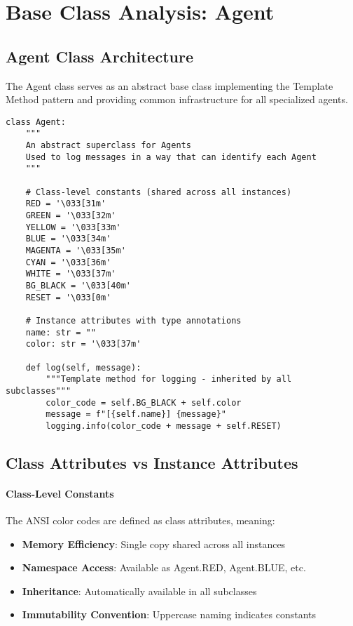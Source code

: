 \section{Base Class Analysis: Agent}

\subsection{Agent Class Architecture}

The Agent class serves as an abstract base class implementing the Template Method pattern and providing common infrastructure for all specialized agents.

\begin{lstlisting}[caption=Agent Base Class - Complete Analysis]
class Agent:
    """
    An abstract superclass for Agents
    Used to log messages in a way that can identify each Agent
    """

    # Class-level constants (shared across all instances)
    RED = '\033[31m'
    GREEN = '\033[32m'
    YELLOW = '\033[33m'
    BLUE = '\033[34m'
    MAGENTA = '\033[35m'
    CYAN = '\033[36m'
    WHITE = '\033[37m'
    BG_BLACK = '\033[40m'
    RESET = '\033[0m'

    # Instance attributes with type annotations
    name: str = ""
    color: str = '\033[37m'

    def log(self, message):
        """Template method for logging - inherited by all subclasses"""
        color_code = self.BG_BLACK + self.color
        message = f"[{self.name}] {message}"
        logging.info(color_code + message + self.RESET)
\end{lstlisting}

\subsection{Class Attributes vs Instance Attributes}

\paragraph{Class-Level Constants}
The ANSI color codes are defined as class attributes, meaning:
\begin{itemize}
\item \textbf{Memory Efficiency}: Single copy shared across all instances
\item \textbf{Namespace Access}: Available as Agent.RED, Agent.BLUE, etc.
\item \textbf{Inheritance}: Automatically available in all subclasses
\item \textbf{Immutability Convention}: Uppercase naming indicates constants
\end{itemize}

